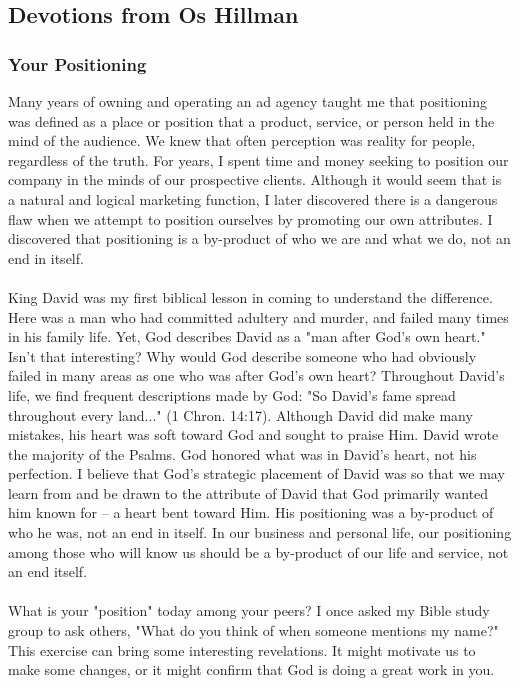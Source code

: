 \subsection{Devotions from Os Hillman}

\subsubsection{Your Positioning}



Many years of owning and operating an ad agency taught me that positioning was defined as a place or position that a product, service, or person held in the mind of the audience. We knew that often perception was reality for people, regardless of the truth. For years, I spent time and money seeking to position our company in the minds of our prospective clients. Although it would seem that is a natural and logical marketing function, I later discovered there is a dangerous flaw when we attempt to position ourselves by promoting our own attributes. I discovered that positioning is a by-product of who we are and what we do, not an end in itself.\\
\\
\noindent King David was my first biblical lesson in coming to understand the difference. Here was a man who had committed adultery and murder, and failed many times in his family life. Yet, God describes David as a "man after God's own heart." Isn't that interesting? Why would God describe someone who had obviously failed in many areas as one who was after God's own heart? Throughout David's life, we find frequent descriptions made by God: "So David's fame spread throughout every land..." (1 Chron. 14:17). Although David did make many mistakes, his heart was soft toward God and sought to praise Him. David wrote the majority of the Psalms. God honored what was in David's heart, not his perfection. I believe that God's strategic placement of David was so that we may learn from and be drawn to the attribute of David that God primarily wanted him known for -- a heart bent toward Him. His positioning was a by-product of who he was, not an end in itself. In our business and personal life, our positioning among those who will know us should be a by-product of our life and service, not an end itself.\\
\\
\noindent What is your "position" today among your peers? I once asked my Bible study group to ask others, "What do you think of when someone mentions my name?" This exercise can bring some interesting revelations. It might motivate us to make some changes, or it might confirm that God is doing a great work in you.